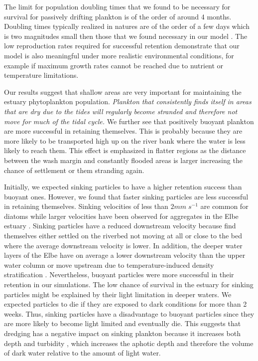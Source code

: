 \documentclass[npg, manuscript]{copernicus}
\begin{document}
The limit for population doubling times that we found to be necessary for survival for passively drifting plankton is of the order of around 4 months. Doubling times typically realized in natures are of the order of a few days which is two magnitudes small then those that we found necessary in our model \citep{Koch2004,Wirtz2011}.
The low reproduction rates required for successful retention demonstrate that our model is also meaningful under more realistic environmental conditions, for example if maximum growth rates cannot be reached due to nutrient or temperature limitations.

Our results suggest that shallow areas are very important for maintaining the estuary phytoplankton population.
\textit{Plankton that consistently finds itself in areas that are dry due to the tides will regularly become stranded and therefore not move for much of the tidal cycle.}
We further see that positively buoyant plankton are more successful in retaining themselves. 
This is probably because they are more likely to be transported high up on the river bank where the water is less likely to reach them.
This effect is emphasized in flatter regions as the distance between the wash margin and constantly flooded areas is larger increasing the chance of settlement or them stranding again.


Initially, we expected sinking particles to have a higher retention success than buoyant ones. 
However, we found that faster sinking particles are less successful in retaining themselves.
Sinking velocities of less than $2 \unit{mm\;s^{-1}}$ are common for diatoms \citep{Passow1991} while larger velocities have been observed for aggregates in the Elbe estuary \citep{Fennessy1996}.
Sinking particles have a reduced downstream velocity because find themselves either settled on the riverbed not moving at all or close to the bed where the average downstream velocity is lower.
In addition, the deeper water layers of the Elbe have on average a lower downstream velocity than the upper water column or move upstream  due to temperature-induced density stratification \citep{Pein2021}.
Nevertheless, buoyant particles were more successful in their retention in our simulations.
The low chance of survival in the estuary for sinking particles might be explained by their light limitation in deeper waters.
We expected particles to die if they are exposed to dark conditions for more than 2 weeks.
Thus, sinking particles have a disadvantage to buoyant particles since they are more likely to become light limited and eventually die.
This suggests that dredging has a negative impact on sinking plankton because it increases both depth and turbidity \citep{DeJonge2014}, which increases the aphotic depth and therefore the volume of dark water relative to the amount of light water.
\end{document}
